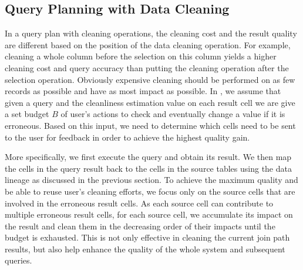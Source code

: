 



\subsection{Query Planning with Data Cleaning}
\label{subsec:gain}


In a query plan with cleaning operations, the cleaning cost and the result quality are different based on the position of the data cleaning operation. For example, cleaning a whole column before the selection on this column yields a higher cleaning cost and query accuracy than putting the cleaning operation after the selection operation. Obviously expensive cleaning should be performed on as few records as possible and have as most impact as possible. 
In \dcv, we assume that given a query and the cleanliness estimation value on each result cell we are give a set budget $B$ of user's actions to check and eventually change a value if it is erroneous.
Based on this input, we need to determine which cells need to be sent to the user for feedback in order
to achieve the highest quality gain.

More specifically,
we first execute the query and obtain its result. 
We then map the cells in the query result back to the cells in the source tables using the data lineage as discussed in the previous section. 
To achieve the maximum quality and be able to reuse user's cleaning efforts, 
we focus only on the source cells that are involved in the erroneous result cells. As each source cell can contribute to multiple erroneous result cells, for each source cell, we accumulate its impact on the result and clean them in the decreasing order of their impacts until the budget is exhausted. This is not only effective in cleaning the current join path results, but also help enhance the quality of the whole system and subsequent queries.








